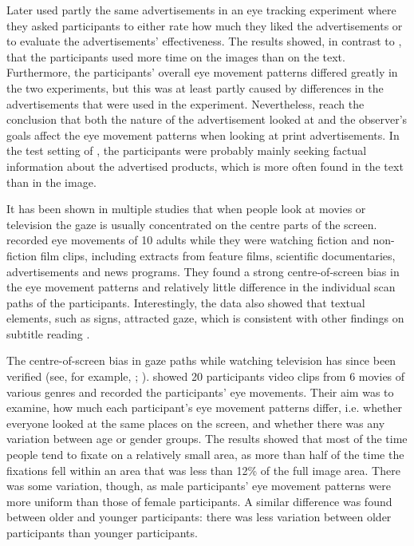 \documentclass[output=paper]{langsci/langscibook}
\begin{document}
Later \citet{rayner2008} used partly the same advertisements in an eye tracking experiment where they asked participants to either rate how much they liked the advertisements or to evaluate the advertisements' effectiveness. The results showed, in contrast to \citet{rayner2001}, that the participants used more time on the images than on the text. Furthermore, the participants' overall eye movement patterns differed greatly in the two experiments, but this was at least partly caused by differences in the advertisements that were used in the experiment. Nevertheless, \citet{rayner2008} reach the conclusion that both the nature of the advertisement looked at and the observer's goals affect the eye movement patterns when looking at print advertisements. In the test setting of \citet{rayner2008}, the participants were probably mainly seeking factual information about the advertised products, which is more often found in the text than in the image. 
 
 
It has been shown in multiple studies that when people look at movies or television the gaze is usually concentrated on the centre parts of the screen. \citet{tosi1997} recorded eye movements of 10 adults while they were watching fiction and non-fiction film clips, including extracts from feature films, scientific documentaries, advertisements and news programs. They found a strong centre-of-screen bias in the eye movement patterns and relatively little difference in the individual scan paths of the participants. Interestingly, the data also showed that textual elements, such as signs, attracted gaze, which is consistent with other findings on subtitle reading \citep{dydewalle1987, dydewalle1991, dydewalle1992}. 

The centre-of-screen bias in gaze paths while watching television has since been verified (see, for example, \citet{goldstein2007}; \citet{brasel2008}). \citet{goldstein2007} showed 20 participants video clips from 6 movies of various genres and recorded the participants' eye movements. Their aim was to examine, how much each participant's eye movement patterns differ, i.e. whether everyone looked at the same places on the screen, and whether there was any variation between age or gender groups. The results showed that most of the time people tend to fixate on a relatively small area, as more than half of the time the fixations fell within an area that was less than 12\% of the full image area. There was some variation, though, as male participants' eye movement patterns were more uniform than those of female participants. A similar difference was found between older and younger participants: there was less variation between older participants than younger participants. 
\end{document}
